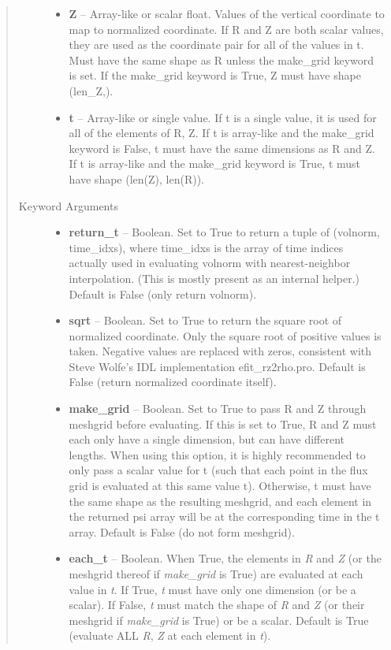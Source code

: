\documentclass[letterpaper,10pt,english]{sphinxmanual}
\begin{document}
\begin{fulllineitems}
\begin{fulllineitems}
\begin{quote}
\begin{description}
\begin{itemize}
\item {} 
\textbf{Z} --
Array-like or scalar float.
Values of the vertical coordinate to
map to normalized coordinate. If R and Z are both scalar values,
they are used as the coordinate pair for all of the values in t.
Must have the same shape as R unless the make\_grid keyword is
set. If the make\_grid keyword is True, Z must have shape (len\_Z,).

\item {} 
\textbf{t} --
Array-like or single value.
If t is a single value, it is used
for all of the elements of R, Z. If t is array-like and the
make\_grid keyword is False, t must have the same dimensions as
R and Z. If t is array-like and the make\_grid keyword is True,
t must have shape (len(Z), len(R)).

\end{itemize}

\item[{Keyword Arguments}] \leavevmode\begin{itemize}
\item {} 
\textbf{return\_t} --
Boolean.
Set to True to return a tuple of (volnorm,
time\_idxs), where time\_idxs is the array of time indices
actually used in evaluating volnorm with nearest-neighbor
interpolation. (This is mostly present as an internal helper.)
Default is False (only return volnorm).

\item {} 
\textbf{sqrt} --
Boolean.
Set to True to return the square root of normalized
coordinate. Only the square root of positive values is taken.
Negative values are replaced with zeros, consistent with Steve
Wolfe's IDL implementation efit\_rz2rho.pro. Default is False
(return normalized coordinate itself).

\item {} 
\textbf{make\_grid} --
Boolean.
Set to True to pass R and Z through meshgrid
before evaluating. If this is set to True, R and Z must each
only have a single dimension, but can have different lengths.
When using this option, it is highly recommended to only pass
a scalar value for t (such that each point in the flux grid is
evaluated at this same value t). Otherwise, t must have the
same shape as the resulting meshgrid, and each element in the
returned psi array will be at the corresponding time in the t
array. Default is False (do not form meshgrid).

\item {} 
\textbf{each\_t} --
Boolean.
When True, the elements in \emph{R} and \emph{Z} (or the meshgrid thereof
if \emph{make\_grid} is True) are evaluated at each value in \emph{t}. If
True, \emph{t} must have only one dimension (or be a scalar). If
False, \emph{t} must match the shape of \emph{R} and \emph{Z} (or their
meshgrid if \emph{make\_grid} is True) or be a scalar. Default is True
(evaluate ALL \emph{R}, \emph{Z} at each element in \emph{t}).


\end{itemize}
\end{description}
\end{quote}
\end{fulllineitems}
\end{fulllineitems}
\end{document}
